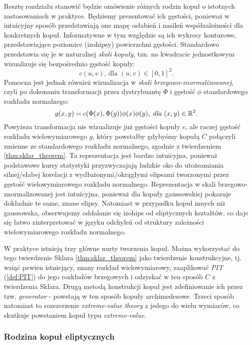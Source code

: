 Resztę rozdziału stanowić będzie omówienie różnych rodzin kopuł o istotnych zastosowaniach w praktyce. Będziemy prezentować ich gęstości, ponieważ w intuicyjny sposób przedstawiają one mapę osłabień i nasileń współzależności dla konkretnych kopuł. Informatywne w tym względzie są ich wykresy konturowe, przedstawiające poziomice (izohipsy) powierzchni gęstości. Standardowo przedstawia się je w naturalnej \emph{skali kopuły}, tzn. na kwadracie jednostkowym wizualizuje się bezpośrednio gęstość kopuły:
$$ c(u, v)\text{, dla } (u, v) \in [0, 1]^2.$$
Pomocna jest jednak również wizualizacja w \emph{skali brzegowo-znormalizowanej}, czyli po dokonaniu transformacji przez dystrybuantę $\Phi$ i gęstość $\phi$ standardowego rozkładu normalnego:
 $$ g(x, y) = c(\Phi(x), \Phi(y))\phi(x)\phi(y)\textit{, dla }(x,y)\in\mathbb{R}^2.$$
Powyższa transformacja nie wizualizuje już gęstości kopuły $c$, ale raczej gęstość rozkładu wielowymiarowego $g$, który powstałby gdybyśmy kopułą $C$ połączyli zmienne ze standardowego rozkładu normalnego, zgodnie z twierdzeniem \ref{thm:sklar_theorem}. Ta reprezentacja jest bardzo intuicyjna, ponieważ podstawowe kursy statystyki przyzwyczajają ludzkie oko do utożsamiania silnej/słabej korelacji z wydłużonymi/okrągłymi elipsami tworzonymi przez gęstość wielowymiarowego rozkładu normalnego. Reprezentacja w skali brzegowo-znormalizowanej jest intuicyjna, ponieważ dla kopuły gaussowskiej pokazuje dokładnie te same, znane elipsy. Natomiast w przypadku kopuł innych niż gaussowska, obserwujemy oddalanie się izohips od eliptycznych kształtów, co daje się łatwo zinterpretować w języku odchyleń od struktury zależności wielowymiarowego rozkładu normalnego.

W praktyce istnieją trzy główne nurty tworzenia kopuł. Można wykorzystać do tego twierdzenie Sklara \ref{thm:sklar_theorem} jako twierdzenie konstrukcyjne, tj. wziąć pewien istniejący, znany rozkład wielowymiarowy, zaaplikować \emph{PIT} (\ref{def:PIT}) do jego rozkładów brzegowych i odzyskać w ten sposób $C$ z twierdzenia Sklara. Drugą metodą konstrukcji kopuł jest zdefiniowanie ich przez tzw. \emph{generator} - powstają w ten sposób kopuły archimedesowe. Trzeci sposób natomiast to rozszerzenie \emph{extreme-value theory} z jedego do wielu wymiarów, co skutkuje powstaniem kopuł typu \emph{extreme-value}.\\

\subsubsection{Rodzina kopuł eliptycznych}

